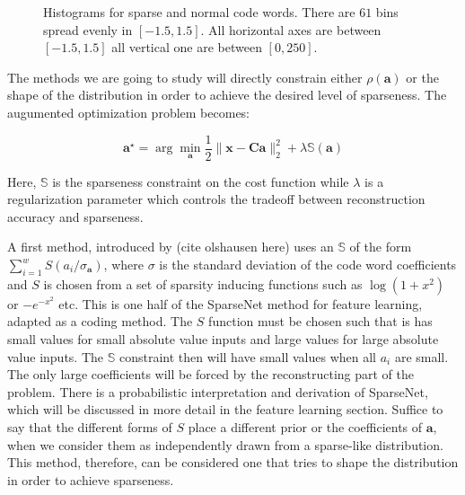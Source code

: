 \documentclass[12pt,a4paper,oneside,english]{UPBThesis}
\begin{document}
\begin{figure}
\centering
{}
\label{fig:CodingMethodsCoeffHists}
\caption{Histograms for sparse and normal code words. There are $61$ bins spread evenly in $[-1.5,1.5]$. All horizontal axes are between $[-1.5,1.5]$ all vertical one are between $[0,250]$.}
\end{figure}

The methods we are going to study will directly constrain either $\rho(\textbf{a})$ or the shape of the distribution in order to achieve the desired level of sparseness. The augumented optimization problem becomes:

\begin{equation*}
\textbf{a}^{\star} = \arg\min_{\textbf{a}} \frac{1}{2} \| \textbf{x} - \textbf{C}\textbf{a} \|_2^2 + \lambda \mathbb{S}(\textbf{a})
\end{equation*}

Here, $\mathbb{S}$ is the sparseness constraint on the cost function while $\lambda$ is a regularization parameter which controls the tradeoff between reconstruction accuracy and sparseness.

A first method, introduced by (cite olshausen here) uses an $\mathbb{S}$ of the form $\sum_{i=1}^w{S(a_i / \sigma_{\textbf{a}})}$, where $\sigma$ is the standard deviation of the code word coefficients and $S$ is chosen from a set of sparsity inducing functions such as $\log(1 + x^2)$ or $-e^{-x^2}$ etc. This is one half of the SparseNet method for feature learning, adapted as a coding method. The $S$ function must be chosen such that is has small values for small absolute value inputs and large values for large absolute value inputs. The $\mathbb{S}$ constraint then will have small values when all $a_i$ are small. The only large coefficients will be forced by the reconstructing part of the problem. There is a probabilistic interpretation and derivation of SparseNet, which will be discussed in more detail in the feature learning section. Suffice to say that the different forms of $S$ place a different prior or the coefficients of $\textbf{a}$, when we consider them as independently drawn from a sparse-like distribution. This method, therefore, can be considered one that tries to shape the distribution in order to achieve sparseness.
\end{document}
